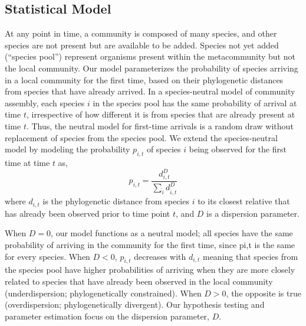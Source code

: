 \documentclass{article}
\begin{document}
\subsection{Statistical Model} \label{sec:statisticalModel}
At any point in time, a community is composed of many species, and other species are not present but are available to be added. Species not yet added (“species pool”) represent organisms present within the metacommunity but not the local community. Our model parameterizes the probability of species arriving in a local community for the first time, based on their phylogenetic distances from species that have already arrived. In a species-neutral model of community assembly, each species \(i\) in the species pool has the same probability of arrival at time \(t\), irrespective of how different it is from species that are already present at time \(t\). Thus, the neutral model for first-time arrivals is a random draw without replacement of species from the species pool. We extend the species-neutral model by modeling the probability \(p_{i,t}\) of species \(i\) being observed for the first time at time \(t\) as,
\begin{equation}
	\label{sec:equation1}
	p_{i,t} = \frac {d_{i,t}^D} { \sum\limits_{\hat{i}} d_{\hat{i},t}^D } 
\end{equation}
where \(d_{i,t}\) is the phylogenetic distance from species \(i\) to its closest relative that has already been observed prior to time point \(t\), and \(D\) is a dispersion parameter.
\par
When \(D = 0\), our model functions as a neutral model; all species have the same probability of arriving in the community for the first time, since pi,t is the same for every species. When \(D < 0\), \(p_{i,t}\) decreases with \(d_{i,t}\) meaning that species from the species pool have higher probabilities of arriving when they are more closely related to species that have already been observed in the local community (underdispersion; phylogenetically constrained). When \(D>0\), the opposite is true (overdispersion; phylogenetically divergent). Our hypothesis testing and parameter estimation focus on the dispersion parameter, \(D\).
\end{document}
